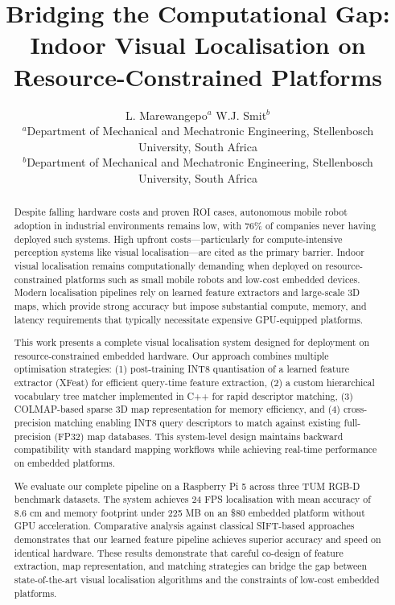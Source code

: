 \documentclass[12pt]{article}
\title{Bridging the Computational Gap: Indoor Visual Localisation on Resource-Constrained Platforms}
\author{
L. Marewangepo$^{a}$ \quad W.J. Smit$^{b}$ \\
\small $^{a}$Department of Mechanical and Mechatronic Engineering, Stellenbosch University, South Africa \\
\small $^{b}$Department of Mechanical and Mechatronic Engineering, Stellenbosch University, South Africa 
}
\date{}
\begin{document}
\maketitle

\begin{abstract}
Despite falling hardware costs and proven ROI cases, autonomous mobile robot adoption in industrial environments remains low, with 76\% of companies never having deployed such systems. High upfront costs—particularly for compute-intensive perception systems like visual localisation—are cited as the primary barrier. Indoor visual localisation remains computationally demanding when deployed on resource-constrained platforms such as small mobile robots and low-cost embedded devices. Modern localisation pipelines rely on learned feature extractors and large-scale 3D maps, which provide strong accuracy but impose substantial compute, memory, and latency requirements that typically necessitate expensive GPU-equipped platforms.

This work presents a complete visual localisation system designed for deployment on resource-constrained embedded hardware. Our approach combines multiple optimisation strategies: (1) post-training INT8 quantisation of a learned feature extractor (XFeat) for efficient query-time feature extraction, (2) a custom hierarchical vocabulary tree matcher implemented in C++ for rapid descriptor matching, (3) COLMAP-based sparse 3D map representation for memory efficiency, and (4) cross-precision matching enabling INT8 query descriptors to match against existing full-precision (FP32) map databases. This system-level design maintains backward compatibility with standard mapping workflows while achieving real-time performance on embedded platforms.

We evaluate our complete pipeline on a Raspberry Pi 5 across three TUM RGB-D benchmark datasets. The system achieves 24 FPS localisation with mean accuracy of 8.6 cm and memory footprint under 225 MB on an \$80 embedded platform without GPU acceleration. Comparative analysis against classical SIFT-based approaches demonstrates that our learned feature pipeline achieves superior accuracy and speed on identical hardware. These results demonstrate that careful co-design of feature extraction, map representation, and matching strategies can bridge the gap between state-of-the-art visual localisation algorithms and the constraints of low-cost embedded platforms.
\end{abstract}
\end{document}
